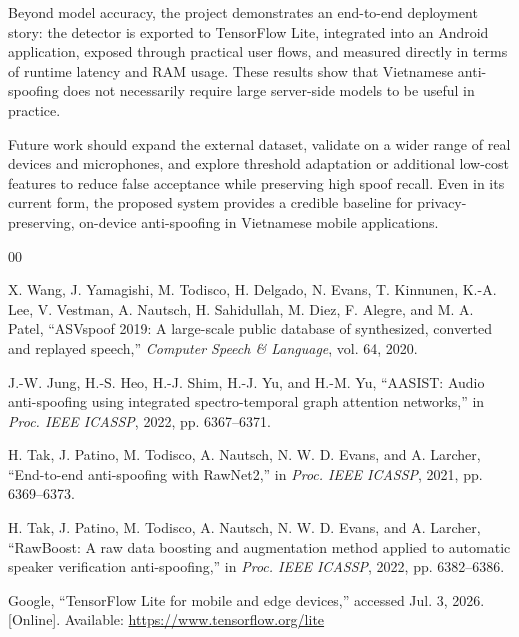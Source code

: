 \documentclass[conference]{IEEEtran}
\begin{document}
Beyond model accuracy, the project demonstrates an end-to-end deployment story: the detector is exported to TensorFlow Lite, integrated into an Android application, exposed through practical user flows, and measured directly in terms of runtime latency and RAM usage. These results show that Vietnamese anti-spoofing does not necessarily require large server-side models to be useful in practice.

Future work should expand the external dataset, validate on a wider range of real devices and microphones, and explore threshold adaptation or additional low-cost features to reduce false acceptance while preserving high spoof recall. Even in its current form, the proposed system provides a credible baseline for privacy-preserving, on-device anti-spoofing in Vietnamese mobile applications.

\begin{thebibliography}{00}

 X. Wang, J. Yamagishi, M. Todisco, H. Delgado, N. Evans, T. Kinnunen, K.-A. Lee, V. Vestman, A. Nautsch, H. Sahidullah, M. Diez, F. Alegre, and M. A. Patel, ``ASVspoof 2019: A large-scale public database of synthesized, converted and replayed speech,'' \emph{Computer Speech \& Language}, vol. 64, 2020.

 J.-W. Jung, H.-S. Heo, H.-J. Shim, H.-J. Yu, and H.-M. Yu, ``AASIST: Audio anti-spoofing using integrated spectro-temporal graph attention networks,'' in \emph{Proc. IEEE ICASSP}, 2022, pp. 6367--6371.

 H. Tak, J. Patino, M. Todisco, A. Nautsch, N. W. D. Evans, and A. Larcher, ``End-to-end anti-spoofing with RawNet2,'' in \emph{Proc. IEEE ICASSP}, 2021, pp. 6369--6373.

 H. Tak, J. Patino, M. Todisco, A. Nautsch, N. W. D. Evans, and A. Larcher, ``RawBoost: A raw data boosting and augmentation method applied to automatic speaker verification anti-spoofing,'' in \emph{Proc. IEEE ICASSP}, 2022, pp. 6382--6386.

 Google, ``TensorFlow Lite for mobile and edge devices,'' accessed Jul. 3, 2026. [Online]. Available: \url{https://www.tensorflow.org/lite}

\end{thebibliography}
\end{document}
